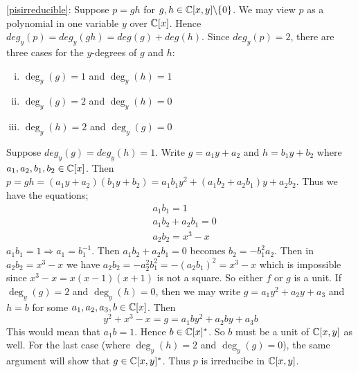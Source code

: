 \begin{solution}
	\eqref{pisirreducible}: Suppose $p = gh $ for $g,h \in \mathbb{C}[x,y] \backslash \lbrace 0 \rbrace $. 
	We may view $p$ as a polynomial in one variable $y$ over $\mathbb{C}[x]$. 
	Hence $deg_y(p)= deg_y(gh) = deg(g) + deg(h)$. Since $deg_y(p)=2$, 
	there are three cases for the $y$-degrees of $g$ and $h$: 
	\begin{enumerate}[(i)]
		\item $\deg_y(g) = 1$ and $\deg_y(h) = 1$ 
		\item $\deg_y(g) = 2$ and $\deg_y(h) = 0$ 
		\item $\deg_y(h) = 2$ and $\deg_y(g) = 0$
	\end{enumerate}
	Suppose $deg_y(g)=deg_y(h)=1$. 
	Write $g= a_1y + a_2$ and $h= b_1y + b_2$ where
	$a_1,a_2,b_1,b_2 \in \mathbb{C}[x]$. 
	Then $p = gh = (a_1y + a_2)(b_1y + b_2) = a_1b_1y^2 + (a_1b_2 + a_2b_1)y + a_2b_2 $.
	Thus we have the equations;
	\begin{align*}
		&a_1b_1 = 1  \\
		&a_1b_2 + a_2b_1 = 0 \\
		&a_2b_2 = x^3 - x 
	\end{align*} 
	$a_1b_1 = 1 \Longrightarrow a_1 = b_1^{-1}$. 
	Then $a_1b_2 + a_2b_1 = 0$ becomes
	$b_2=- b_1^2a_2$. Then in $a_2b_2 = x^3 - x $ we have
	$a_2b_2 = - a_2^2b_1^2 = - (a_2b_1)^2 = x^3 - x$ which is 
	impossible since $x^3 - x = x(x-1)(x+1)$ is not a 
	square. So either $f$ or $g$ is a unit. 
	If $\deg_y(g) = 2$ and $\deg_y(h) = 0$, then we 
	may write $g = a_1y^2 + a_2y + a_3$ and $h = b$ for some 
	$a_1,a_2,a_3,b \in \mathbb{C}[x]$. 
	Then $$y^2 +x^3 - x = g = a_1by^2 + a_2by + a_3b$$
	This would mean that $a_1b= 1$. Hence $b \in \mathbb{C}[x]^* $.
	So $b$ must be a unit of $\mathbb{C}[x,y]$ as well. For the last
	case (where $\deg_y(h) = 2$ and $\deg_y(g) = 0$), the same 
	argument will show that $g \in \mathbb{C}[x,y]^*$.
	Thus $p$ is irreducibe in $\mathbb{C}[x,y]$.  \\


\end{solution}
